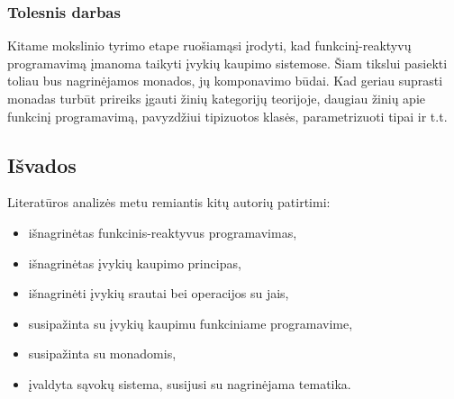 \subsubsection{Tolesnis darbas}

Kitame mokslinio tyrimo etape ruošiamąsi įrodyti, kad funkcinį-reaktyvų programavimą įmanoma taikyti įvykių kaupimo sistemose. Šiam tikslui pasiekti toliau bus nagrinėjamos monados, jų komponavimo būdai. Kad geriau suprasti monadas turbūt prireiks įgauti žinių kategorijų teorijoje, daugiau žinių apie funkcinį programavimą, pavyzdžiui tipizuotos klasės, parametrizuoti tipai ir t.t.

\subsection{Išvados}

Literatūros analizės metu remiantis kitų autorių patirtimi:

\begin{itemize}

\item išnagrinėtas funkcinis-reaktyvus programavimas,

\item išnagrinėtas įvykių kaupimo principas,

\item išnagrinėti įvykių srautai bei operacijos su jais,

\item susipažinta su įvykių kaupimu funkciniame programavime,

\item susipažinta su monadomis,

\item įvaldyta sąvokų sistema, susijusi su nagrinėjama tematika.

\end{itemize}
